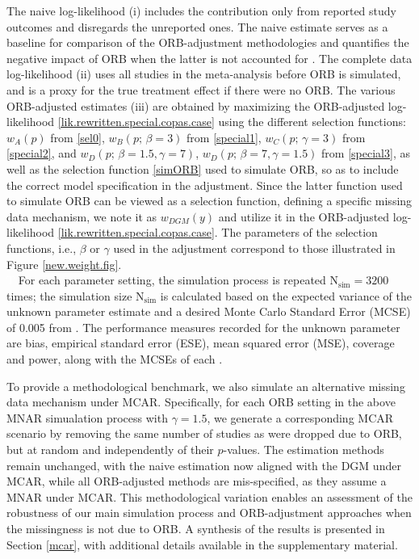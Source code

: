 \documentclass[twocolumn]{article}\usepackage[]{graphicx}\usepackage[]{xcolor}
\begin{document}
The naive log-likelihood (i) includes the contribution only from reported study outcomes and disregards the unreported ones. The naive estimate serves as a baseline for comparison of the ORB-adjustment methodologies and quantifies the negative impact of ORB when the latter is not accounted for \citep{reviewselection, Copas2019}. The complete data log-likelihood (ii) uses all studies in the meta-analysis before ORB is simulated, and is a proxy for the true treatment effect if there were no ORB. The various ORB-adjusted estimates (iii) are obtained by maximizing the ORB-adjusted log-likelihood \eqref{lik.rewritten.special.copas.case} using the different selection functions:  $w_A(p)$ from \eqref{sel0}, $w_B(p \text{; } \beta=3)$ from \eqref{special1}, $w_C(p \text{; } \gamma=3)$ from \eqref{special2}, and $w_D(p \text{; } \beta=1.5, \gamma=7)$, $w_D(p \text{; } \beta=7, \gamma=1.5)$ from \eqref{special3}, as well as the selection function \eqref{simORB} used to simulate ORB, so as to include the correct model specification in the adjustment. Since the latter function used to simulate ORB can be viewed as a selection function, defining a specific missing data mechanism, we note it as $w_{DGM}(y)$ and utilize it in the ORB-adjusted log-likelihood \eqref{lik.rewritten.special.copas.case}. The parameters of the selection functions, i.e., $\beta$ or $\gamma$ used in the adjustment correspond to those illustrated in Figure \ref{new.weight.fig}.\\
\textcolor{white}{T} For each parameter setting, the simulation process is repeated $\text{N}_{\text{sim}} = 3200$ times; the simulation size $\text{N}_{\text{sim}}$ is calculated based on the expected variance of the unknown parameter estimate \citep{IntHout2014, sim} and a desired Monte Carlo Standard Error (MCSE) of 0.005 from \citet{IntHout2014, sim}. The performance measures recorded for the unknown parameter are bias, empirical standard error (ESE), mean squared error (MSE), coverage and power, along with the MCSEs of each \citep{IntHout2014, sim}.

To provide a methodological benchmark, we also simulate an alternative missing data mechanism under MCAR. Specifically, for each ORB setting in the above MNAR simualation process with $\gamma = 1.5$, we generate a corresponding MCAR scenario by removing the same number of studies as were dropped due to ORB, but at random and independently of their $p$-values. The estimation methods remain unchanged, with the naive estimation now aligned with the DGM under MCAR, while all ORB-adjusted methods are mis-specified, as they assume a MNAR under MCAR. This methodological variation enables an assessment of the robustness of our main simulation process and ORB-adjustment approaches when the missingness is not due to ORB. A synthesis of the results is presented in Section \ref{mcar}, with additional details available in the supplementary material.
\end{document}
